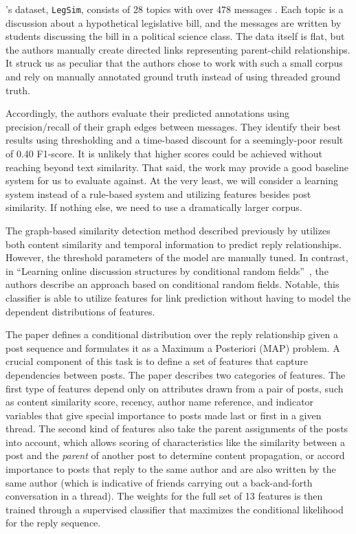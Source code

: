\documentclass[11pt]{article}
\newcommand{\titlecite}[2]{``#1''~\cite{#2}}
\begin{document}
\cite{Wang2008a}'s dataset, \texttt{LegSim}, consists of 28 topics with over 
478 messages . Each topic is a discussion about a hypothetical legislative bill, 
and the messages are written by students discussing the bill in a political science class. 
The data itself is flat, but the authors manually create directed links representing
parent-child relationships. It struck us as peculiar that the authors chose to work
with such a small corpus and rely on manually annotated ground truth instead of using
threaded ground truth.

Accordingly, the authors evaluate their predicted annotations using precision/recall of
their graph edges between messages. They identify their best results using
thresholding and a time-based discount for a seemingly-poor result of 0.40 
F1-score. It is unlikely that higher scores could be achieved without reaching
beyond text similarity. That said, the work may provide a good baseline system
for us to evaluate against. At the very least, we will consider a learning
system instead of a rule-based system and utilizing features besides post
similarity.  If nothing else, we need to use a dramatically larger corpus.

The graph-based similarity detection method described previously by
\cite{Wang2008a} utilizes both content similarity and temporal information to
predict reply relationships. However, the threshold parameters of the model are
manually tuned. In contrast, in \titlecite{Learning online discussion structures
by conditional random fields}{Wang2011a},
the authors describe an approach based on conditional random
fields. Notable, this classifier is able to utilize features for link prediction
without having to model the dependent distributions of features.

The \cite{Wang2011a} paper defines a conditional distribution over the reply
relationship given a post sequence and formulates it as a Maximum a Posteriori
(MAP) problem. A crucial component of this task is to define a set of features
that capture dependencies between posts. The paper describes two categories of
features. The first type of features depend only on attributes drawn from a pair
of posts, such as content similarity score, recency, author name reference, and
indicator variables that give special importance to posts made last or first in
a given thread. The second kind of features also take the parent assignments of
the posts into account, which allows scoring of characteristics like the
similarity between a post and the \emph{parent} of another post to determine
content propagation, or accord importance to posts that reply to the same author
and are also written by the same author (which is indicative of friends carrying
out a back-and-forth conversation in a thread). The weights for the full set of
13 features is then trained through a supervised classifier that maximizes the
conditional likelihood for the reply sequence.
\end{document}
